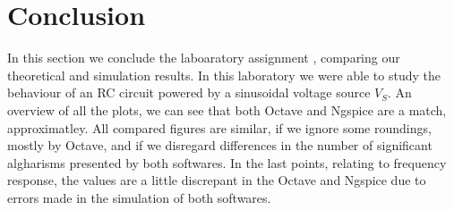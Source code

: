 \section{Conclusion}
\label{sec:conclusion}


In this section we conclude the laboaratory assignment , comparing our theoretical and simulation results. 
In this laboratory we were able to study the behaviour of an RC circuit powered by a sinusoidal voltage source $V_S$.
An overview of all the plots, we can see that both Octave and Ngspice are a match, approximatley.
All compared figures are similar, if we ignore some roundings, mostly by Octave, and if we disregard differences in the number of significant algharisms presented by both softwares. 
In the last points, relating to frequency response, the values are a little discrepant in the Octave and Ngspice due to errors made in the simulation of both softwares.

